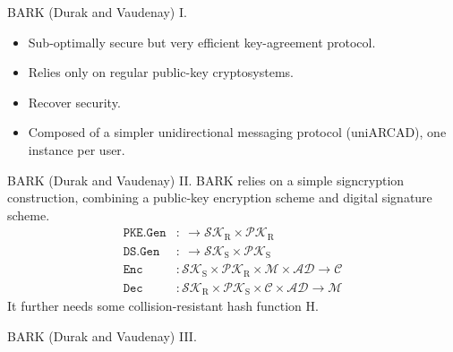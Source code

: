 \documentclass{beamer}
\renewcommand{\t}{\text}
\begin{document}
\begin{frame}{BARK (Durak and Vaudenay) I.}
  \begin{itemize}
  \item Sub-optimally secure but very efficient key-agreement protocol.
  \item Relies only on regular public-key cryptosystems.
  \item Recover security.
  \item Composed of a simpler unidirectional messaging protocol (uniARCAD),
    one instance per user.
  \end{itemize}
\end{frame}

\begin{frame}{BARK (Durak and Vaudenay) II.}
  BARK relies on a simple signcryption construction, combining a public-key
  encryption scheme and digital signature scheme.
  \begin{align*}
    \texttt{PKE.Gen} & : \ \rightarrow \mathcal{SK}_\t{R} \times \mathcal{PK}_\t{R} \\
    \texttt{DS.Gen} & : \ \rightarrow \mathcal{SK}_\t{S} \times \mathcal{PK}_\t{S} \\
    \texttt{Enc} & : \mathcal{SK}_\t{S} \times \mathcal{PK}_\t{R} \times \mathcal{M} \times
                   \mathcal{AD} \rightarrow \mathcal{C} \\
    \texttt{Dec} & : \mathcal{SK}_\t{R} \times \mathcal{PK}_\t{S} \times
  \mathcal{C} \times \mathcal{AD} \rightarrow \mathcal{M}
  \end{align*}
  It further needs some collision-resistant hash function H.
\end{frame}

\begin{frame}{BARK (Durak and Vaudenay) III.}
   \begin{figure}[h]
     \centering
     \setlength{\fboxsep}{10pt}
     \scalebox{0.7}{%
       \fbox{%
          
       }
     }
  \end{figure}
\end{frame}
\end{document}
